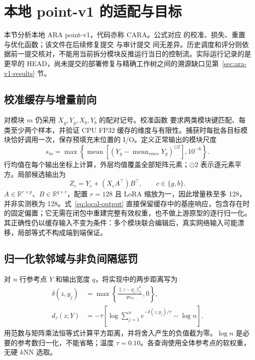 \section{本地 point-v1 的适配与目标}
\label{sec:local-adaptation}

本节分析本地 ARA point-v1，代码亦称 CARA。公式对应  的校准、损失、重置与优化函数；该文件在后续修复提交  与审计提交  间无差异\cite{ara2026localv1,ara2026localv2}。历史调度和评分则依据前一提交核对，不能用当前拆分模块反推运行当日的控制流。实际运行记录的是更早的 HEAD，尚未提交的部署修复与精确工作树之间的溯源缺口见第~\ref{sec:ara-v1-results} 节。

\subsection{校准缓存与增量前向}

对模块 $m$ 仍采用 $X_g,Y_g,X_b,Y_b$ 的配对记号。校准函数  要求两类模块键匹配、每类至少两个样本，并验证 CPU FP32 缓存的维度与有限性。捕获时每批各目标模块恰好调用一次，保存预填充末位置的 I/O。定义正常输出的模块尺度
\begin{equation}
 s_m=\max\!\left\{\operatorname{mean}
 [(Y_g-\operatorname{mean}_{rows}Y_g)^{\odot 2}],10^{-6}\right\}.
 \label{eq:local-scale}
\end{equation}
行均值在每个输出坐标上计算，外层均值覆盖全部矩阵元素；$\odot 2$ 表示逐元素平方。局部候选输出为
\begin{equation}
 Z_c=Y_c+(X_c A^\top)B^\top,\qquad c\in\{g,b\}.
 \label{eq:local-output}
\end{equation}
$A\in\mathbb R^{r\times p}$、$B\in\mathbb R^{q\times r}$，配置 $r=128$ 且 LoRA 缩放为一，因此增量秩至多 128，并非实测秩为 128。式~\eqref{eq:local-output} 直接保留缓存中的基座响应，包含存在时的固定偏置；它无需在闭包中重建完整有效权重，也不做上游原型的逐行归一化。其正确性仍以缓存输入不变为条件：多个模块联合编辑后，真实网络输入可能漂移，局部等式不构成端到端保证。

\subsection{归一化软邻域与非负间隔惩罚}

对 $n$ 行参考点 $Y$ 和输出宽度 $q$，将实现中的两步距离写为
\begin{align}
 \delta(z,y_j)&=\max\!\left\{\frac{\|z-y_j\|_2^2}{q s_m},0\right\},\\
 d_\tau(z;Y)&=-\tau\left[\log\sum_{j=1}^{n}
 e^{-\delta(z,y_j)/\tau}-\log n\right].
 \label{eq:local-soft-distance}
\end{align}
 用范数与矩阵乘法恒等式计算平方距离，并将舍入产生的负值截为零。$\log n$ 是必要的参考数归一化，不能省略；温度 $\tau=0.10$。各查询使用全体参考点的软权重，无硬 $k$NN 选取。

